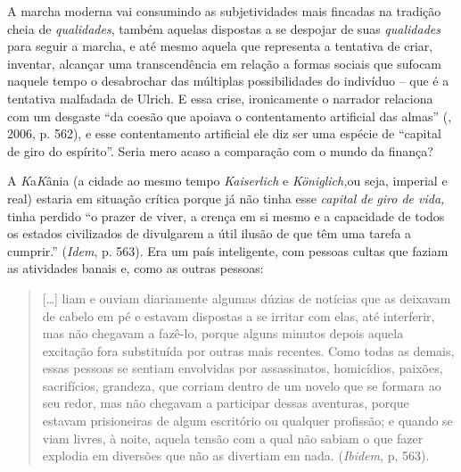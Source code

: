 A marcha moderna vai consumindo as subjetividades mais fincadas na
tradição cheia de \emph{qualidades}, também aquelas dispostas a se
despojar de suas \emph{qualidades} para seguir a marcha, e até mesmo
aquela que representa a tentativa de criar, inventar, alcançar uma
transcendência em relação a formas sociais que sufocam naquele tempo o
desabrochar das múltiplas possibilidades do indivíduo -- que é a
tentativa malfadada de Ulrich. E essa crise, ironicamente o narrador
relaciona com um desgaste ``da coesão que apoiava o contentamento
artificial das almas'' (, 2006, p. 562), e esse contentamento
artificial ele diz ser uma espécie de ``capital de giro do espírito''.
Seria mero acaso a comparação com o mundo da finança?

A \emph{K}a\emph{K}ânia (a cidade ao mesmo tempo \emph{Kaiserlich} e
\emph{Königlich,}ou seja, imperial e real) estaria em situação crítica
porque já não tinha esse \emph{capital} \emph{de} \emph{giro de vida,}
tinha perdido ``o prazer de viver, a crença em si mesmo e a capacidade
de todos os estados civilizados de divulgarem a útil ilusão de que têm
uma tarefa a cumprir.'' (\emph{Idem}, p. 563). Era um país
inteligente, com pessoas cultas que faziam as atividades banais e, como
as outras pessoas:

\begin{quote}
[\ldots{}] liam e ouviam diariamente algumas dúzias de notícias que as
deixavam de cabelo em pé e estavam dispostas a se irritar com elas, até
interferir, mas não chegavam a fazê-lo, porque alguns minutos depois
aquela excitação fora substituída por outras mais recentes. Como todas
as demais, essas pessoas se sentiam envolvidas por assassinatos,
homicídios, paixões, sacrifícios, grandeza, que corriam dentro de um
novelo que se formara ao seu redor, mas não chegavam a participar dessas
aventuras, porque estavam prisioneiras de algum escritório ou qualquer
profissão; e quando se viam livres, à noite, aquela tensão com a qual
não sabiam o que fazer explodia em diversões que não as divertiam em
nada. (\emph{Ibidem}, p, 563).
\end{quote}

